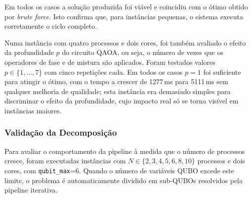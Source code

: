 Em todos os casos a solução produzida foi viável e coincidiu com o ótimo obtido por
\textit{brute force}. Isto confirma que, para instâncias pequenas, o sistema executa corretamente
o ciclo completo.

Numa instância com quatro processos e dois cores, foi também avaliado o efeito da
profundidade $p$ do circuito QAOA, ou seja, o número de vezes que os operadores de fase
e de mistura são aplicados. Foram testados valores $p \in \{1, \ldots, 7\}$ com cinco
repetições cada. Em todos os casos $p=1$ foi suficiente para atingir o ótimo, com o
tempo a crescer de 1277\,ms para 5111\,ms sem qualquer melhoria de qualidade; esta
instância era demasiado simples para discriminar o efeito da profundidade, cujo impacto
real só se torna visível em instâncias maiores.

\subsubsection{Validação da Decomposição}

Para avaliar o comportamento da pipeline à medida que o número de processos cresce, foram
executadas instâncias com $N \in \{2, 3, 4, 5, 6, 8, 10\}$ processos e dois cores, com
\texttt{qubit\_max}=6. Quando o número de variáveis QUBO excede este limite, o problema
é automaticamente dividido em sub-QUBOs resolvidos pela pipeline
iterativa.

\begin{table}[H]
\centering
{}
\caption{Escalabilidade da pipeline com o número de processos.}
\label{tab:resultados-d1}
\end{table}

